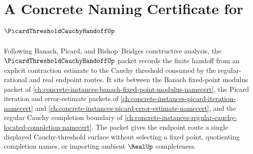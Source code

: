 \chapter{A Concrete Naming Certificate for $\PicardThresholdCauchyHandoffUp$}
\label{ch:concrete-instances-picard-threshold-cauchy-handoff-namecert}

Following Banach, Picard, and Bishop--Bridges constructive analysis, the $\PicardThresholdCauchyHandoffUp$ packet records the finite handoff from an explicit contraction estimate to the Cauchy threshold consumed by the regular-rational and real endpoint routes. It sits between the Banach fixed-point modulus packet of \autoref{ch:concrete-instances-banach-fixed-point-modulus-namecert}, the Picard iteration and error-estimate packets of \autoref{ch:concrete-instances-picard-iteration-namecert} and \autoref{ch:concrete-instances-picard-error-estimate-namecert}, and the regular Cauchy completion boundary of \autoref{ch:concrete-instances-regular-cauchy-located-completion-namecert}. The packet gives the endpoint route a single displayed Cauchy-threshold surface without selecting a fixed point, quotienting completion names, or importing ambient $\RealUp$ completeness.


